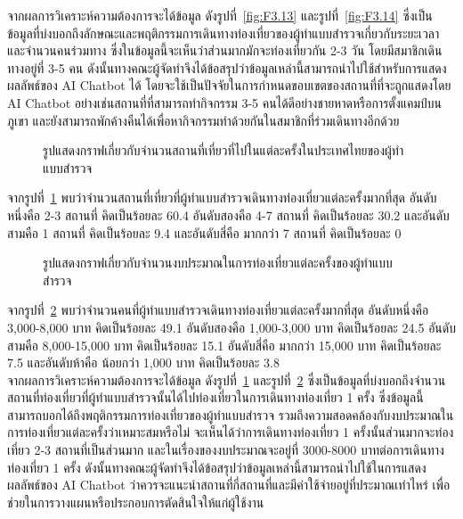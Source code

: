 \documentclass[12pt,oneside,openright,a4paper]{cpe-thai-project}
\begin{document}
จากผลการวิเคราะห์ความต้องการจะได้ข้อมูล ดังรูปที่~\ref{fig:F3.13} และรูปที่~\ref{fig:F3.14} ซึ่งเป็นข้อมูลที่บ่งบอกถึงลักษณะและพฤติกรรมการเดินทางท่องเที่ยวของผู้ทำแบบสำรวจเกี่ยวกับระยะเวลาและจำนวนคนร่วมทาง ซึ่งในข้อมูลนี้จะเห็นว่าส่วนมากมักจะท่องเที่ยวกัน 2-3 วัน โดยมีสมาชิกเดินทางอยู่ที่ 3-5 คน ดังนั้นทางคณะผู้จัดทำจึงได้ข้อสรุปว่าข้อมูลเหล่านี้สามารถนำไปใช้สำหรับการแสดงผลลัพธ์ของ AI Chatbot ได้ โดยจะใช้เป็นปัจจัยในการกำหนดขอบเขตของสถานที่ที่จะถูกแสดงโดย AI Chatbot อย่างเช่นสถานที่ที่สามารถทำกิจกรรม 3-5 คนได้ดีอย่างชายหาดหรือการตั้งแคมป์บนภูเขา และยังสามารถพักค้างคืนได้เพื่อหากิจกรรมทำด้วยกันในสมาชิกที่ร่วมเดินทางอีกด้วย \\

\begin{figure}[!h]\centering
\setlength{\fboxrule}{0mm}
\caption{รูปแสดงกราฟเกี่ยวกับจำนวนสถานที่เที่ยวที่ไปในแต่ละครั้งในประเทศไทยของผู้ทำแบบสำรวจ}\label{fig:F3.15}
\end{figure}
จากรูปที่~\ref{fig:F3.15} พบว่าจำนวนสถานที่เที่ยวที่ผู้ทำแบบสำรวจเดินทางท่องเที่ยวแต่ละครั้งมากที่สุด อันดับหนึ่งคือ 2-3 สถานที่ คิดเป็นร้อยละ 60.4 อันดับสองคือ 4-7 สถานที่ คิดเป็นร้อยละ 30.2 และอันดับสามคือ 1 สถานที่ คิดเป็นร้อยละ 9.4 และอันดับสี่คือ มากกว่า 7 สถานที่ คิดเป็นร้อยละ 0 \newpage

\begin{figure}[!h]\centering
\setlength{\fboxrule}{0mm}
\caption{รูปแสดงกราฟเกี่ยวกับจำนวนงบประมาณในการท่องเที่ยวแต่ละครั้งของผู้ทำแบบสำรวจ}\label{fig:F3.16}
\end{figure}
จากรูปที่~\ref{fig:F3.16} พบว่าจำนวนคนที่ผู้ทำแบบสำรวจเดินทางท่องเที่ยวแต่ละครั้งมากที่สุด อันดับหนึ่งคือ 3,000-8,000 บาท คิดเป็นร้อยละ 49.1 อันดับสองคือ 1,000-3,000 บาท คิดเป็นร้อยละ 24.5 อันดับสามคือ 8,000-15,000 บาท คิดเป็นร้อยละ 15.1 อันดับสี่คือ มากกว่า 15,000 บาท คิดเป็นร้อยละ 7.5 และอันดับห้าคือ น้อยกว่า 1,000 บาท คิดเป็นร้อยละ 3.8 \\

จากผลการวิเคราะห์ความต้องการจะได้ข้อมูล ดังรูปที่~\ref{fig:F3.15} และรูปที่~\ref{fig:F3.16} ซึ่งเป็นข้อมูลที่บ่งบอกถึงจำนวนสถานที่ท่องเที่ยวที่ผู้ทำแบบสำรวจนั้นได้ไปท่องเที่ยวในการเดินทางท่องเที่ยว 1 ครั้ง ซึ่งข้อมูลนี้สามารถบอกได้ถึงพฤติกรรมการท่องเที่ยวของผู้ทำแบบสำรวจ รวมถึงความสอดคล้องกับงบประมาณในการท่องเที่ยวแต่ละครั้งว่าเหมาะสมหรือไม่ จะเห็นได้ว่าการเดินทางท่องเที่ยว 1 ครั้งนั้นส่วนมากจะท่องเที่ยว 2-3 สถานที่เป็นส่วนมาก และในเรื่องของงบประมาณจะอยู่ที่ 3000-8000 บาทต่อการเดินทางท่องเที่ยว 1 ครั้ง ดังนั้นทางคณะผู้จัดทำจึงได้ข้อสรุปว่าข้อมูลเหล่านี้สามารถนำไปใช้ในการแสดงผลลัพธ์ของ AI Chatbot ว่าควรจะแนะนำสถานที่กี่สถานที่และมีค่าใช้จ่ายอยู่ที่ประมาณเท่าไหร่ เพื่อช่วยในการวางแผนหรือประกอบการตัดสินใจให้แก่ผู้ใช้งาน \newpage
\end{document}
